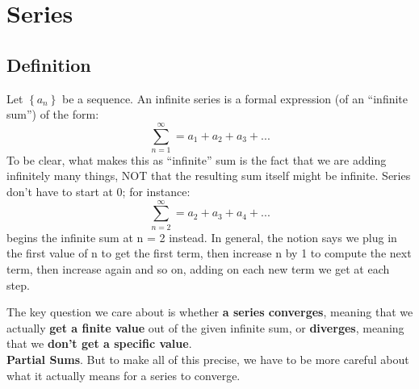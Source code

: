 \documentclass{article}
\begin{document}
\pagebreak
%
%
%
%
%
%

\section{Series}
\subsection{Definition}
Let $\left\{a_n \right\}$ be a sequence.  An infinite series is a formal expression (of an “infinite sum”) of the form:
$$\sum_{n=1}^{\infty} = a_1 + a_2 + a_3 + ...$$
To be clear, what makes this as “infinite” sum is the fact that we are adding infinitely many things, NOT that the resulting sum itself might be infinite. Series don’t have to start at 0; for instance:
$$\sum_{n=2}^{\infty} = a_2 + a_3 + a_4 + ...$$
begins the infinite sum at n = 2 instead. In general, the notion says we plug in the first value of n to get the first term, then increase n by 1 to compute the next term, then increase again and so on, adding on each new term we get at each step. 

The key question we care about is whether \textbf{a series converges}, meaning that we actually \textbf{get a finite value} out of the given infinite sum, or \textbf{diverges}, meaning that we \textbf{don’t get a specific value}. \\
\newline
\textbf{Partial Sums}. But to make all of this precise, we have to be more careful about what it actually means for a series to converge. 
\end{document}
